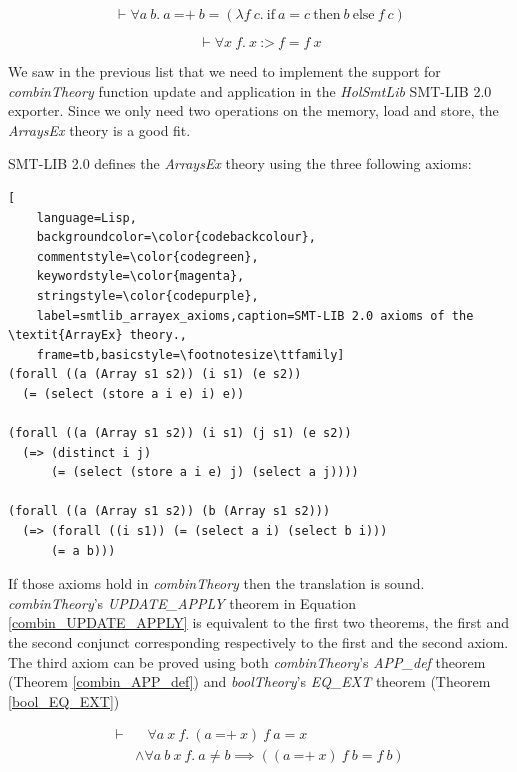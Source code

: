 \documentclass{kththesis}
\begin{document}
\begin{equation}
    \vdash \forall a~b.~a~\text{=+}~b = (\lambda f~c.~\text{if}~a = c~\text{then}~b~\text{else}~f~c)
    \label{combin_UPDATE_def}
\end{equation}

\begin{equation}
    \vdash \forall x~f.~x~\text{:>}~f = f~x
    \label{combin_APP_def}
\end{equation}

We saw in the previous list that we need to implement the support for \textit{combinTheory} function update and application in the \textit{HolSmtLib} SMT-LIB 2.0 exporter. Since we only need two operations on the memory, load and store, the \textit{ArraysEx} theory is a good fit.

SMT-LIB 2.0 \cite{barrett_satisfiability_2016} defines the \textit{ArraysEx} theory using the three following axioms:

\begin{lstlisting}[
    language=Lisp,
    backgroundcolor=\color{codebackcolour},
    commentstyle=\color{codegreen},
    keywordstyle=\color{magenta},
    stringstyle=\color{codepurple},
    label=smtlib_arrayex_axioms,caption=SMT-LIB 2.0 axioms of the \textit{ArrayEx} theory.,
    frame=tb,basicstyle=\footnotesize\ttfamily]
(forall ((a (Array s1 s2)) (i s1) (e s2))
  (= (select (store a i e) i) e)) 

(forall ((a (Array s1 s2)) (i s1) (j s1) (e s2))
  (=> (distinct i j)
      (= (select (store a i e) j) (select a j))))

(forall ((a (Array s1 s2)) (b (Array s1 s2)))
  (=> (forall ((i s1)) (= (select a i) (select b i)))
      (= a b)))
\end{lstlisting}

If those axioms hold in \textit{combinTheory} then the translation is sound. \textit{combinTheory}'s \textit{UPDATE\_APPLY} theorem in Equation \ref{combin_UPDATE_APPLY} is equivalent to the first two theorems, the first and the second conjunct corresponding respectively to the first and the second axiom. The third axiom can be proved using both \textit{combinTheory}'s \textit{APP\_def} theorem (Theorem \ref{combin_APP_def}) and \textit{boolTheory}'s \textit{EQ\_EXT} theorem (Theorem \ref{bool_EQ_EXT})

\begin{equation}
    \begin{split}
        \vdash &  ~~~~ \forall a~x~f.~(a~\text{=+}~x)~f~a = x\\
               & \land \forall a~b~x~f.~a \neq b \implies ((a~\text{=+}~x)~f~b = f~b)
    \end{split}
    \label{combin_UPDATE_APPLY}
\end{equation}
\end{document}

